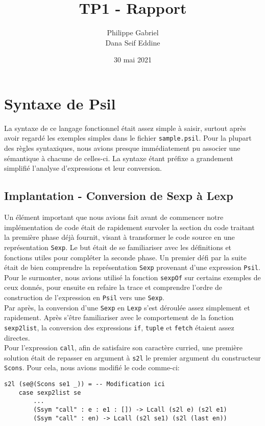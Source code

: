\documentclass[10pt, titlepage]{article}
\begin{document}
\title{{\Huge \textbf{TP1 - Rapport}}}
\author{Philippe Gabriel \\ Dana Seif Eddine}
\date{30 mai 2021}

\onehalfspacing

\maketitle

\setcounter{page}{2}

\newpage

\section{Syntaxe de Psil}

La syntaxe de ce langage fonctionnel était assez simple à saisir, surtout
après avoir regardé les exemples simples dans le fichier \texttt{sample.psil}.
Pour la plupart des règles syntaxiques, nous avions presque immédiatement pu
associer une sémantique à chacune de celles-ci. La syntaxe étant préfixe a
grandement simplifié l'analyse d'expressions et leur conversion.

\subsection{Implantation - Conversion de Sexp à Lexp}

Un élément important que nous avions fait avant de commencer notre
implémentation de code était de rapidement survoler la section du code traitant
la première phase déjà fournit, visant à transformer le code source en une
représentation \texttt{Sexp}. Le but était de se familiariser avec les
définitions et fonctions utiles pour compléter la seconde phase. Un premier
défi par la suite était de bien comprendre la représentation \texttt{Sexp}
provenant d'une expression \texttt{Psil}. Pour le surmonter, nous avions
utilisé la fonction \texttt{sexpOf} sur certains exemples de ceux donnés, pour
ensuite en refaire la trace et comprendre l'ordre de construction de
l'expression en \texttt{Psil} vers une \texttt{Sexp}. \\

Par après, la conversion d'une \texttt{Sexp} en \texttt{Lexp} s'est déroulée
assez simplement et rapidement. Après s'être familiariser avec le comportement
de la fonction \texttt{sexp2list}, la conversion des expressions \texttt{if},
\texttt{tuple} et \texttt{fetch} étaient assez directes. \\
Pour l'expression \texttt{call}, afin de satisfaire son caractère curried, une
première solution était de repasser en argument à \texttt{s2l} le premier
argument du constructeur \texttt{Scons}. Pour cela, nous avions modifié le code
comme-ci:
\begin{lstlisting}
s2l (se@(Scons se1 _)) = -- Modification ici
    case sexp2list se
        ...
        (Ssym "call" : e : e1 : []) -> Lcall (s2l e) (s2l e1)
        (Ssym "call" : en) -> Lcall (s2l se1) (s2l (last en))
\end{lstlisting}
\end{document}
